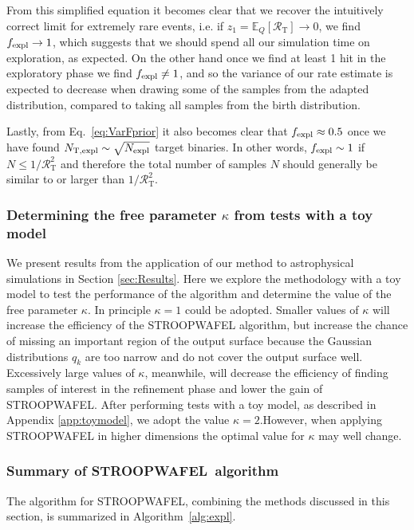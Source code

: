 \documentclass[a4paper,fleqn,usenatbib,useAMS,usedcolumn]{mnras}
\newcommand\rate{\mathcal{R}}
\newcommand{\AISs}{\textsc{STROOPWAFEL}}
\begin{document}
From this simplified equation it becomes clear that we recover the intuitively correct limit for extremely rare events, i.e. if  $z_1 = {\mathbb{E}_Q[\rate_{\text{T}}]} \rightarrow 0  $, we find $f_{\rm{expl}} \rightarrow 1$, which suggests that we should spend all our simulation time on exploration, as expected.  On the other hand once we find at least 1 hit in the exploratory phase we find $f_{\rm{expl}} \neq 1$, and so the variance of our rate estimate is expected to decrease when drawing some of the samples from the adapted distribution, compared to taking all samples from the birth distribution.  

Lastly, from Eq.~\ref{eq:VarFprior} it also becomes clear that $f_{\rm{expl}} \approx 0.5$ once we have found $N_{\rm{T,expl}} \sim \sqrt{N_{\rm{expl}}}$ target binaries. 
 In other words, $f_{\rm{expl}} \sim 1 $ if $N \leq 1/\rate_{\text{T}}^2$ and therefore the total number of samples $N$ should generally be similar to or larger than  $ 1/\rate_{\text{T}}^2$. 


\subsubsection{Determining the free parameter $\kappa$ from tests with a toy model }
\label{subsec:kappaAndToymodel}
We present results from the application of our method to astrophysical simulations in Section \ref{sec:Results}. Here we explore the methodology with a toy model to test  the performance of the algorithm and determine the value of the free parameter $\kappa$.  In principle $\kappa = 1$ could be adopted. Smaller values of $\kappa$ will increase the efficiency of the \AISs{} algorithm, but increase the chance of missing an important region of the output surface because the Gaussian distributions $q_k$ are too narrow and do not cover the output surface well. Excessively large values of $\kappa$, meanwhile, will decrease the efficiency of finding samples of interest in the refinement phase and lower the gain of \AISs.  After performing tests with a toy model, as described in Appendix \ref{app:toymodel}, we adopt the value $\kappa =2$.However, when applying \AISs{} in higher dimensions the optimal value for $\kappa$ may well change.


\subsubsection{Summary of \AISs \ algorithm}
\label{subsubsec:algorithmflow}
The algorithm for \AISs{}, combining the methods discussed in this section, is summarized in Algorithm~\ref{alg:expl}.
\end{document}
